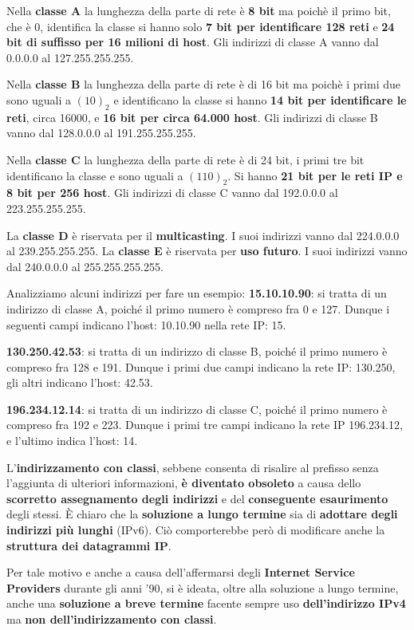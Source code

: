 \documentclass[11pt,a4paper,oneside]{book}
\theoremstyle{definition}
\begin{document}
Nella \textbf{classe A} la lunghezza della parte di rete è \textbf{8 bit} ma poichè il primo bit, che è 0, identifica la classe si hanno solo \textbf{7 bit per identificare 128 reti} e \textbf{24 bit di suffisso per 16 milioni di host}. Gli indirizzi di classe A vanno dal 0.0.0.0 al 127.255.255.255.

Nella \textbf{classe B} la lunghezza della parte di rete è di 16 bit ma poichè i primi due sono uguali a $(10)_{2}$ e identificano la classe si hanno \textbf{14 bit per identificare le reti}, circa 16000, e \textbf{16 bit per circa 64.000 host}. Gli indirizzi di classe B vanno dal 128.0.0.0 al 191.255.255.255.

Nella \textbf{classe C} la lunghezza della parte di rete è di 24 bit, i primi tre bit identificano la classe e sono uguali a $(110)_{2}$. Si hanno \textbf{21 bit per le reti IP e 8 bit per 256 host}. Gli indirizzi di classe C vanno dal 192.0.0.0 al 223.255.255.255.

La \textbf{classe D} è riservata per il \textbf{multicasting}. I suoi indirizzi vanno dal  224.0.0.0 al 239.255.255.255. La \textbf{classe E} è riservata per \textbf{uso futuro}. I suoi indirizzi vanno dal 240.0.0.0 al 255.255.255.255.

Analizziamo alcuni indirizzi per fare un esempio:
\textbf{15.10.10.90}: si tratta di un indirizzo di classe A, poiché il primo
numero è compreso fra 0 e 127. Dunque i seguenti campi indicano l’host: 10.10.90 nella rete IP: 15.

\textbf{130.250.42.53}: si tratta di un indirizzo di classe B, poiché il primo
numero è compreso fra 128 e 191. Dunque i primi due campi indicano la rete IP: 130.250, gli altri indicano l’host: 42.53.

\textbf{196.234.12.14}: si tratta di un indirizzo di classe C, poiché il primo
numero è compreso fra 192 e 223. Dunque i primi tre campi indicano la rete IP 196.234.12, e l’ultimo indica l’host: 14.

\pagebreak

L'\textbf{indirizzamento con classi}, sebbene consenta di risalire al prefisso senza l'aggiunta di ulteriori informazioni, \textbf{è diventato obsoleto} a causa dello \textbf{scorretto assegnamento degli indirizzi} e del \textbf{conseguente esaurimento} degli stessi. È chiaro che la \textbf{soluzione a lungo termine} sia di \textbf{adottare degli indirizzi più lunghi} (IPv6). Ciò comporterebbe però di modificare anche la \textbf{struttura dei datagrammi IP}.

Per tale motivo e anche a causa dell'affermarsi degli \textbf{Internet Service Providers} durante gli anni '90, si è ideata, oltre alla soluzione a lungo termine, anche una \textbf{soluzione a breve termine} facente sempre uso \textbf{dell'indirizzo IPv4} ma \textbf{non dell'indirizzamento con classi}.
\end{document}
